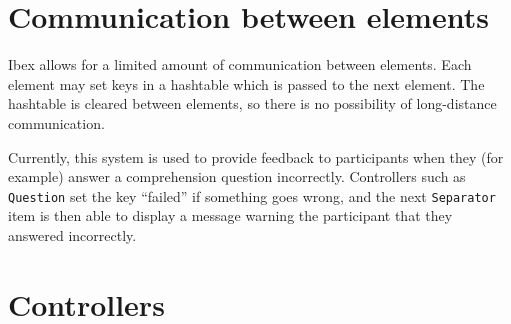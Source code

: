 \documentclass[]{article}
\newenvironment{Shaded}{}{}
\newcommand{\KeywordTok}[1]{\textcolor[rgb]{0.00,0.44,0.13}{\textbf{{#1}}}}
\newcommand{\DataTypeTok}[1]{\textcolor[rgb]{0.56,0.13,0.00}{{#1}}}
\newcommand{\DecValTok}[1]{\textcolor[rgb]{0.25,0.63,0.44}{{#1}}}
\newcommand{\StringTok}[1]{\textcolor[rgb]{0.25,0.44,0.63}{{#1}}}
\newcommand{\CommentTok}[1]{\textcolor[rgb]{0.38,0.63,0.69}{\textit{{#1}}}}
\newcommand{\OtherTok}[1]{\textcolor[rgb]{0.00,0.44,0.13}{{#1}}}
\newcommand{\FunctionTok}[1]{\textcolor[rgb]{0.02,0.16,0.49}{{#1}}}
\newcommand{\NormalTok}[1]{{#1}}
\begin{document}
\begin{Shaded}
\end{Shaded}

\section{Communication between
elements}\label{communication-between-elements}

Ibex allows for a limited amount of communication between elements. Each
element may set keys in a hashtable which is passed to the next element.
The hashtable is cleared between elements, so there is no possibility of
long-distance communication.

Currently, this system is used to provide feedback to participants when
they (for example) answer a comprehension question incorrectly.
Controllers such as \texttt{Question} set the key ``failed'' if
something goes wrong, and the next \texttt{Separator} item is then able
to display a message warning the participant that they answered
incorrectly.

\section{Controllers}\label{controllers}
\end{document}

